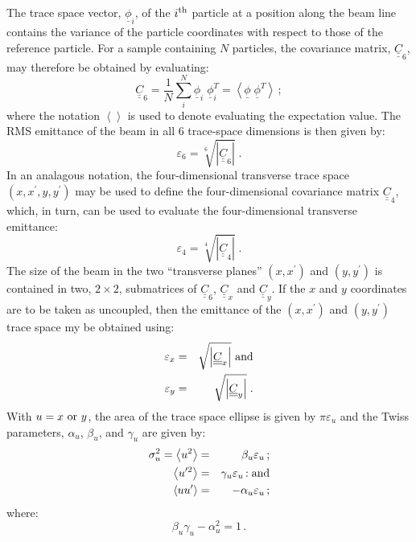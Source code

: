 The trace space vector, $\underline{\phi}_i$, of the $i^{\rm th}$
particle at a position along the beam line contains the variance of
the particle coordinates with respect to those of the reference
particle.
For a sample containing $N$ particles, the covariance matrix,
$\underline{\underline{C}}_6$, may therefore be obtained by evaluating:
\begin{equation}
  \underline{\underline{C}}_6 = \frac{1}{N} \sum_i^N
                                    \underline{\phi}_i \; \underline{\phi}_i^T
                              = \left<
                                    \underline{\phi} \; \underline{\phi}^T
                                \right> \, ;
  \label{Eq:Cov6}
\end{equation}
where the notation $\left< \right>$ is used to denote evaluating the
expectation value.
The RMS emittance of the beam in all 6 trace-space dimensions is then
given by:
\begin{equation}
  \varepsilon_6 = \sqrt[6]{\left| \underline{\underline{C}}_6 \right| }\;.
\end{equation}
In an analagous notation, the four-dimensional transverse trace space
$(x, x^\prime, y, y^\prime)$ may be used to define the
four-dimensional covariance matrix $\underline{\underline{C}}_4$,
which, in turn, can be used to evaluate the four-dimensional
transverse emittance:
\begin{equation}
  \varepsilon_4 = \sqrt[4]{\left| \underline{\underline{C}}_4 \right| }\;.
\end{equation}
The size of the beam in the two ``transverse planes'' $(x, x^\prime)$
and $(y, y^\prime)$ is contained in two, $2 \times 2$, submatrices of
$\underline{\underline{C}}_6$, $\underline{\underline{C}}_x$ and
$\underline{\underline{C}}_y$.
If the $x$ and $y$ coordinates are to be taken as uncoupled, then the
emittance of the $(x, x^\prime)$ and $(y, y^\prime)$ trace space my
be obtained using:
\begin{eqnarray}
  \varepsilon_x & = & \sqrt     {\left| \underline{\underline{C}}_x \right| }
    {\rm~and} \\
  \varepsilon_y & = & \sqrt{\left| \underline{\underline{C}}_y \right| }\;.
\end{eqnarray}
With $u=x~{\rm or}~y$, the area of the trace space ellipse is given
by $\pi \varepsilon_u$ and the Twiss parameters, $\alpha_u$,
$\beta_u$, and $\gamma_u$ are given by:
\begin{eqnarray}
  \sigma_u^2 = \left< u^2 \right> &         = & \beta_u \varepsilon_u \, ;            \\
  \left< u^{\prime 2} \right> &              = & \gamma_u \varepsilon_u \, {\rm : and} \\
  \left< u u^\prime \right>   &              = & -\alpha_u \varepsilon_u \, ;
\end{eqnarray}
where:
\begin{equation}
  \beta_u \gamma_u - \alpha_u^2 = 1 \, .
\end{equation}

